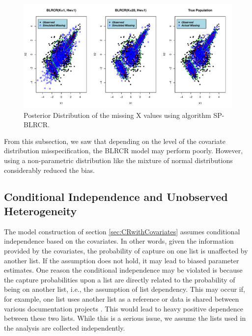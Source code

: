 \documentclass[
  12pt,
]{article}
\begin{document}
\begin{figure}[H]

{\centering \includegraphics{dissertationmain_files/figure-latex/posteriormixtureplots-1} 

}

\caption{\label{fig:mixx}Posterior Distribution of the missing X values using algorithm SP-BLRCR.}\label{fig:posteriormixtureplots}
\end{figure}

From this subsection, we saw that depending on the level of the
covariate distribution misspecification, the BLRCR model may perform
poorly. However, using a non-parametric distribution like the mixture of
normal distributions considerably reduced the bias.

\subsection{Conditional Independence and Unobserved Heterogeneity}
\label{Sec:condindependence}

The model construction of section \ref{sec:CRwithCovariates} assumes
conditional independence based on the covariates. In other words, given
the information provided by the covariates, the probability of capture
on one list is unaffected by another list. If the assumption does not
hold, it may lead to biased parameter estimates. One reason the
conditional independence may be violated is because the capture
probabilities upon a list are directly related to the probability of
being on another list, i.e., the assumption of list dependency. This may
occur if, for example, one list uses another list as a reference or data
is shared between various documentation projects
\citep{manrique-vallier_capture-recapture_2020}. This would lead to
heavy positive dependence between these two lists. While this is a
serious issue, we assume the lists used in the analysis are collected
independently.
\end{document}
